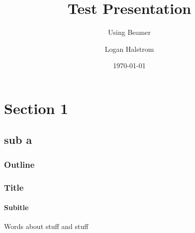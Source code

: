 \documentclass{beamer}
\title{Test Presentation}
\subtitle{Using Beamer}
\author{Logan Halstrom}
\institute{UCD + NASA}
\date{\today}
\begin{document}

\begin{frame}
\titlepage
\end{frame}


\section{Section 1}
\subsection{sub a}

\begin{frame}
\frametitle{Outline}
\tableofcontents
\end{frame}


\begin{frame}
\frametitle{Title}
\framesubtitle{Subitle}
Words about stuff and stuff
\end{frame}
\end{document}
